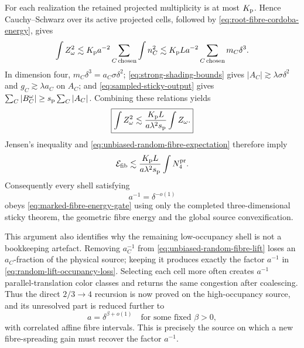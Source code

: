 \documentclass[11pt]{article}
\begin{document}
For each realization the retained projected multiplicity is at most
\(K_{\rm p}\).  Hence Cauchy--Schwarz over its active projected cells,
followed by \eqref{eq:root-fibre-cordoba-energy}, gives
\[
 \int Z_\omega^2
 \lesssim K_{\rm p}a^{-2}
 \sum_{C\,\mathrm{chosen}}\int n_C^2
 \lesssim K_{\rm p}La^{-2}
 \sum_{C\,\mathrm{chosen}}m_C\delta^3 .
\]
In dimension four,
\(m_C\delta^3=a_C\sigma\delta^2\);
\eqref{eq:strong-shading-bounds} gives
\(|A_C|\gtrsim\lambda\sigma\delta^2\) and
\(g_C\gtrsim\lambda a_C\) on \(A_C\); and
\eqref{eq:sampled-sticky-output} gives
\(\sum_C|B_C^\omega|
 \ge s_{\rm p}\sum_C|A_C|\).  Combining these relations yields
\begin{equation}\label{eq:random-lift-occupancy-loss}
 \boxed{
 \int Z_\omega^2
 \lesssim
 \frac{K_{\rm p}L}
      {a\lambda^2s_{\rm p}}
 \int Z_\omega.}
\end{equation}
Jensen's inequality and
\eqref{eq:unbiased-random-fibre-expectation} therefore imply
\begin{equation}\label{eq:convexified-high-occupancy-energy}
 \mathcal E_{\rm fib}
 \lesssim
 \frac{K_{\rm p}L}
      {a\lambda^2s_{\rm p}}
 \int N_4^{\rm pr}.
\end{equation}
Consequently every shell satisfying
\begin{equation}\label{eq:subpower-occupancy-closure}
 a^{-1}=\delta^{-o(1)}
\end{equation}
obeys \eqref{eq:marked-fibre-energy-gate} using only the completed
three-dimensional sticky theorem, the geometric fibre energy and the global
source convexification.

This argument also identifies why the remaining low-occupancy shell is not a
bookkeeping artefact.  Removing \(a_C^{-1}\) from
\eqref{eq:unbiased-random-fibre-lift} loses an \(a_C\)-fraction of the
physical source; keeping it produces exactly the factor \(a^{-1}\) in
\eqref{eq:random-lift-occupancy-loss}.  Selecting each cell more often
creates \(a^{-1}\) parallel-translation color classes and returns the
same congestion after coalescing.  Thus the direct \(2/3\to4\) recursion
is now proved on the high-occupancy source, and its unresolved part is reduced
further to
\begin{equation}\label{eq:low-occupancy-marked-source}
 a=\delta^{\beta+o(1)}
 \quad\text{for some fixed }\beta>0,
\end{equation}
with correlated affine fibre intervals.  This is precisely the source on
which a new fibre-spreading gain must recover the factor \(a^{-1}\).
\end{document}
